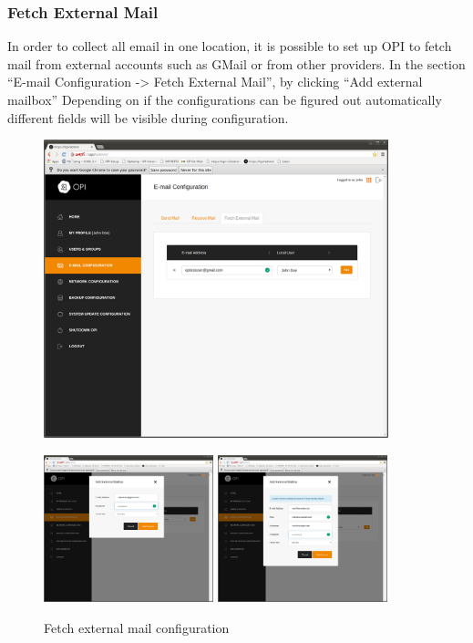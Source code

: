 \documentclass[12pt,a4paper,titlepage]{article}
\begin{document}
\subsubsection{Fetch External Mail}
In order to collect all email in one location, it is possible to set up OPI to fetch mail from external accounts such as GMail or from other providers.
In the section ``E-mail Configuration -> Fetch External Mail'', by clicking ``Add external mailbox''
Depending on if the configurations can be figured out automatically different fields will be visible during configuration.
\begin{figure}[h]
\centering
\includegraphics[width=10cm]{./img/fetch-mail-1}

\includegraphics[width=4.93cm]{./img/fetch-mail-2}
\includegraphics[width=4.93cm]{./img/fetch-mail-3}
\caption{Fetch external mail configuration}
\end{figure}
\end{document}
